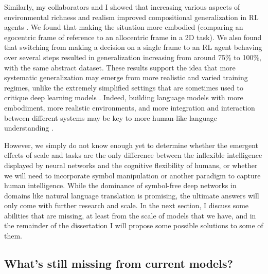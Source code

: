 Similarly, my collaborators and I showed that increasing various aspects of environmental richness and realism improved compositional generalization in RL agents \citep{Hill2019a}. We found that making the situation more embodied (comparing an egocentric frame of reference to an allocentric frame in a 2D task). We also found that switching from making a decision on a single frame to an RL agent behaving over several steps resulted in generalization increasing from around 75\% to 100\%, with the same abstract dataset. These results support the idea that more systematic generalization may emerge from more realistic and varied training regimes, unlike the extremely simplified settings that are sometimes used to critique deep learning models \citep[see e.g.][]{Lake2017}. Indeed, building language models with more embodiment, more realistic environments, and more integration and interaction between different systems may be key to more human-like language understanding \citep{McClelland2019}.\par
However, we simply do not know enough yet to determine whether the emergent effects of scale and tasks are the only difference between the inflexible intelligence displayed by neural networks and the cognitive flexibility of humans, or whether we will need to incorporate symbol manipulation or another paradigm to capture human intelligence. While the dominance of symbol-free deep networks in domains like natural language translation is promising, the ultimate answers will only come with further research and scale. In the next section, I discuss some abilities that are missing, at least from the scale of models that we have, and in the remainder of the dissertation I will propose some possible solutions to some of them. \par 

\subsection{What's still missing from current models?}

